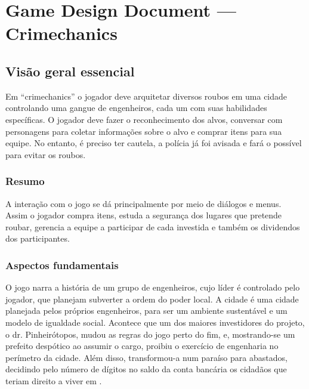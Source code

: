\chapter{Game Design Document --- Crimechanics}\label{ap:gdd}
\section{Visão geral essencial}

Em ``crimechanics'' o jogador deve arquitetar diversos roubos em uma cidade controlando uma gangue de engenheiros, cada um com suas habilidades específicas. O jogador deve fazer o reconhecimento dos alvos, conversar com personagens para coletar informações sobre o alvo e comprar itens para sua equipe. No entanto, é preciso ter cautela, a polícia já foi avisada e fará o possível para evitar os roubos.

\subsection{Resumo}

A interação com o jogo se dá principalmente  por meio de diálogos e menus. Assim o jogador compra itens, estuda a segurança dos lugares que pretende roubar, gerencia a equipe a participar de cada investida e também os dividendos dos participantes.

\subsection{Aspectos fundamentais}

O jogo narra a história de um grupo de engenheiros, cujo líder é controlado pelo jogador, que planejam subverter a ordem do poder local. A cidade é uma cidade planejada pelos próprios engenheiros, para ser um ambiente sustentável e um modelo de igualdade social. Acontece que um dos maiores investidores do projeto, o dr. Pinheirótopos, mudou as regras do jogo perto do fim, e, mostrando-se um prefeito despótico ao assumir o cargo, proibiu o exercício de engenharia no perímetro da cidade. Além disso, transformou-a num paraíso para abastados, decidindo pelo número de dígitos no saldo da conta bancária os cidadãos que teriam direito a viver em \nomeCidade.

